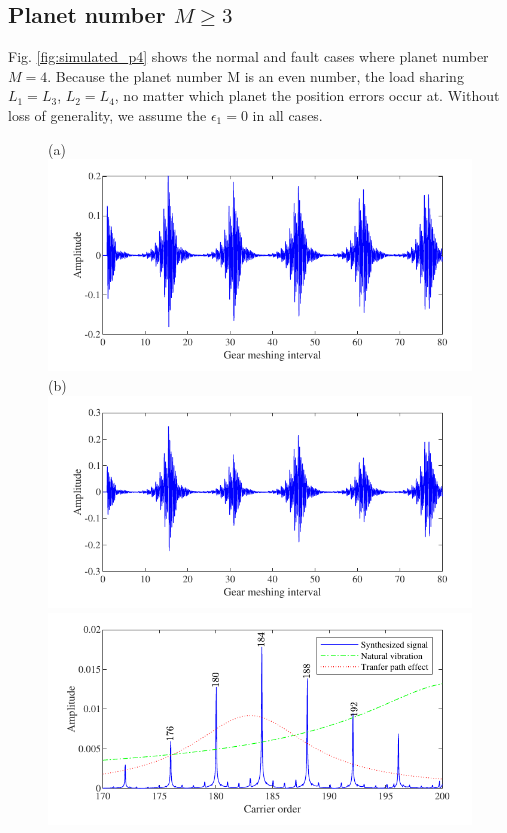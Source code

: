 \documentclass[a4paper,fleqn]{cas-sc}%
\begin{document}
\subsection{Planet number $M \geq 3$}
\par Fig. \ref{fig:simulated_p4} shows the normal and fault cases where planet number $M=4$. Because the planet number M is an even number, the load sharing $L_1=L_3$, $L_2=L_4$, no matter which planet the position errors occur at. Without loss of generality, we assume the $\epsilon_1 = 0$ in all cases.
\begin{figure}[pos=htbp]
    \centering
    (a) \includegraphics[scale=\myscale,valign=t]{Time_p4_normal.pdf}
    (b) \includegraphics[scale=\myscale,valign=t]{Time_p4_fault.pdf}\\
    \hspace*{1.5em}\includegraphics[scale=\myscale,valign=t]{Freq_p4_normal.pdf}

\end{figure}
\end{document}
